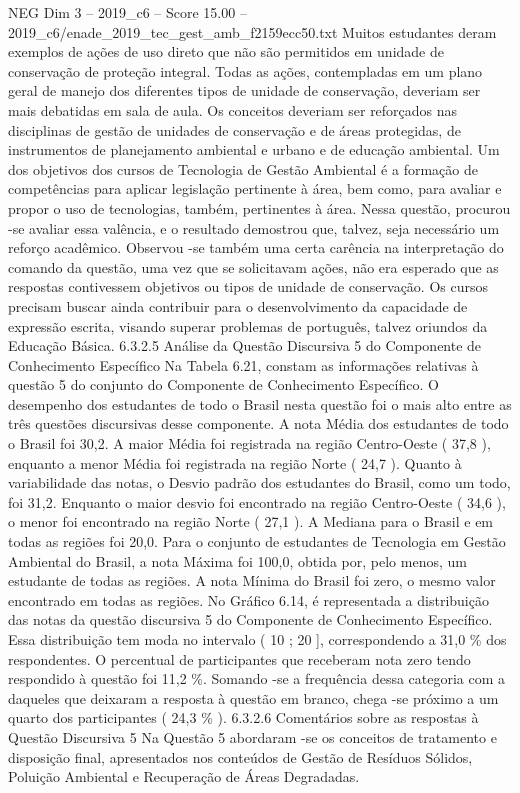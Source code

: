 \begin{textsample}{NEG Dim 3 – 2019\_c6 – Score 15.00 – 2019\_c6/enade\_2019\_tec\_gest\_amb\_f2159ecc50.txt}
Muitos estudantes deram exemplos de ações de uso direto que não são permitidos em unidade de conservação de proteção integral.
Todas as ações, contempladas em um plano geral de manejo dos diferentes tipos de unidade de conservação, deveriam ser mais debatidas em sala de aula.
Os conceitos deveriam ser reforçados nas disciplinas de gestão de unidades de conservação e de áreas protegidas, de instrumentos de planejamento ambiental e urbano e de educação ambiental.
Um dos objetivos dos cursos de Tecnologia de Gestão Ambiental é a formação de competências para aplicar legislação pertinente à área, bem como, para avaliar e propor o uso de tecnologias, também, pertinentes à área.
Nessa questão, procurou -se avaliar essa valência, e o resultado demostrou que, talvez, seja necessário um reforço acadêmico.
Observou -se também uma certa carência na interpretação do comando da questão, uma vez que se solicitavam ações, não era esperado que as respostas contivessem objetivos ou tipos de unidade de conservação.
Os cursos precisam buscar ainda contribuir para o desenvolvimento da capacidade de expressão escrita, visando superar problemas de português, talvez oriundos da Educação Básica. 6.3.2.5 Análise da Questão Discursiva 5 do Componente de Conhecimento Específico Na Tabela 6.21, constam as informações relativas à questão 5 do conjunto do Componente de Conhecimento Específico.
O desempenho dos estudantes de todo o Brasil nesta questão foi o mais alto entre as três questões discursivas desse componente.
A nota Média dos estudantes de todo o Brasil foi 30,2.
A maior Média foi registrada na região Centro-Oeste ( 37,8 ), enquanto a menor Média foi registrada na região Norte ( 24,7 ).
Quanto à variabilidade das notas, o Desvio padrão dos estudantes do Brasil, como um todo, foi 31,2.
Enquanto o maior desvio foi encontrado na região Centro-Oeste ( 34,6 ), o menor foi encontrado na região Norte ( 27,1 ).
A Mediana para o Brasil e em todas as regiões foi 20,0.
Para o conjunto de estudantes de Tecnologia em Gestão Ambiental do Brasil, a nota Máxima foi 100,0, obtida por, pelo menos, um estudante de todas as regiões.
A nota Mínima do Brasil foi zero, o mesmo valor encontrado em todas as regiões.
No Gráfico 6.14, é representada a distribuição das notas da questão discursiva 5 do Componente de Conhecimento Específico.
Essa distribuição tem moda no intervalo ( 10 ; 20 ], correspondendo a 31,0 \% dos respondentes.
O percentual de participantes que receberam nota zero tendo respondido à questão foi 11,2 \%.
Somando -se a frequência dessa categoria com a daqueles que deixaram a resposta à questão em branco, chega -se próximo a um quarto dos participantes ( 24,3 \% ). 6.3.2.6 Comentários sobre as respostas à Questão Discursiva 5 Na Questão 5 abordaram -se os conceitos de tratamento e disposição final, apresentados nos conteúdos de Gestão de Resíduos Sólidos, Poluição Ambiental e Recuperação de Áreas Degradadas.

\end{textsample}
